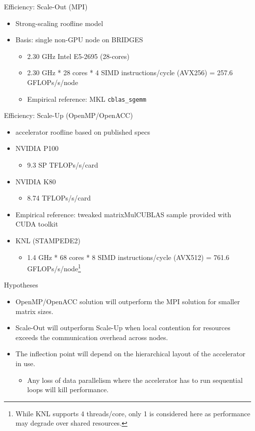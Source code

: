 \documentclass{beamer}
\begin{document}
\begin{frame}{Efficiency: Scale-Out (MPI)}
  \begin{itemize}
  \item{Strong-scaling roofline model}
  \item{Basis: single non-GPU node on BRIDGES}
    \begin{itemize}
    \item{2.30 GHz Intel E5-2695 (28-cores)}
    \item{2.30 GHz * 28 cores * 4 SIMD instructions/cycle (AVX256) = 257.6 GFLOPs/s/node}
    \item{Empirical reference: MKL \texttt{cblas\_sgemm}}
    \end{itemize}
  \end{itemize}
\end{frame}
\begin{frame}{Efficiency: Scale-Up (OpenMP/OpenACC)}
  \begin{itemize}
  \item{accelerator roofline based on published specs}
  \item{NVIDIA P100}
    \begin{itemize}
      \item{9.3 SP TFLOPs/s/card\autocite{P100Datasheet}}
    \end{itemize}
  \item{NVIDIA K80}
    \begin{itemize}
      \item{8.74 TFLOPs/s/card\autocite{AnandtechK80}}
    \end{itemize}
  \item{Empirical reference: tweaked matrixMulCUBLAS sample provided with CUDA toolkit}
  \item{KNL (STAMPEDE2)}
    \begin{itemize}
      \item{1.4 GHz * 68 cores * 8 SIMD instructions/cycle (AVX512) = 761.6 GFLOPs/s/node\autocite{Stampede2UserGuide}\footnote{While KNL supports 4 threads/core, only 1 is considered here as performance may degrade over shared resources.}}
    \end{itemize}
  \end{itemize}
\end{frame}
\begin{frame}{Hypotheses}
  \begin{itemize}
  \item{OpenMP\autocite{openmp45spec}/OpenACC\autocite{OpenACCStd} solution will outperform the MPI solution for smaller matrix sizes.}
  \item{Scale-Out will outperform Scale-Up when local contention for resources exceeds the communication overhead across nodes.}
  \item{The inflection point will depend on the hierarchical layout of the accelerator in use.}
    \begin{itemize}
      \item{Any loss of data parallelism where the accelerator has to run sequential loops will kill performance.}
    \end{itemize}
  \end{itemize}
\end{frame}
\end{document}
